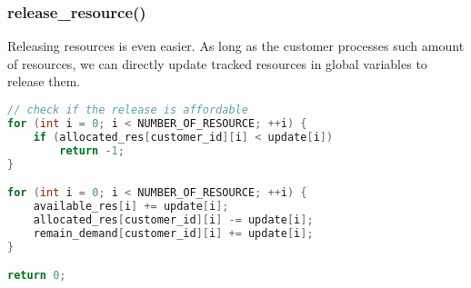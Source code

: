 \documentclass{article}
\begin{document}
\subsubsection*{release\_resource()}
Releasing resources is even easier. As long as the customer processes such amount of resources, we can directly update tracked resources in global variables to release them.

\begin{lstlisting}[language=c, caption={release\_resource()}]
// check if the release is affordable
for (int i = 0; i < NUMBER_OF_RESOURCE; ++i) {
    if (allocated_res[customer_id][i] < update[i])
        return -1;
}

for (int i = 0; i < NUMBER_OF_RESOURCE; ++i) {
    available_res[i] += update[i];
    allocated_res[customer_id][i] -= update[i];
    remain_demand[customer_id][i] += update[i];
}

return 0;
\end{lstlisting}
\end{document}

